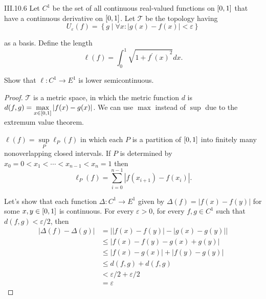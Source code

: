 \begin{problem}{III.10.6}
Let \(C^{1}\) be the set of all continuous real-valued functions on \( \left\lbrack{0,1}\right\rbrack \) that have a continuous derivative on \( \left\lbrack{0,1}\right\rbrack \). Let \( \mathscr{T} \) be the topology having
\[
	U_{\varepsilon}(f) = \left\{ g \mid \forall x: \left\vert g(x) - f(x) \right\vert < \varepsilon \right\}
\]

as a basis. Define the length
\[
	\ell(f) = \int_{0}^{1} \sqrt{1 + {f^{\prime}(x)}^{2}}dx.
\]

Show that \( \ell: C^{1} \to E^{1} \) is lower semicontinuous.
\end{problem}

\begin{proof}
	\( \mathscr{T} \) is a metric space, in which the metric function \( d \) is \( d(f, g) = \max\limits_{x\in\left\lbrack{0,1}\right\rbrack} \left\vert f(x) - g(x) \right\vert \). We can use \( \max \) instead of \( \sup \) due to the extremum value theorem.

	\( \ell(f) = \sup\limits_{P} \ell_{P}(f) \) in which each \( P \) is a partition of \( \left\lbrack{0,1}\right\rbrack \) into finitely many nonoverlapping closed intervals. If \( P \) is determined by \( x_{0} = 0 < x_{1} < \cdots < x_{n-1} < x_{n} = 1 \) then
	\[
		\ell_{P}(f) = \sum^{n-1}_{i=0} \left\vert f(x_{i+1}) - f(x_{i}) \right\vert.
	\]

	Let's show that each function \( \Delta: C^{1} \to E^{1} \) given by \( \Delta(f) = \left\vert f(x) - f(y) \right\vert \) for some \( x, y \in \left\lbrack{0,1}\right\rbrack \) is continuous. For every \( \varepsilon > 0 \), for every \( f, g \in C^{1} \) such that \( d(f, g) < \varepsilon/2 \), then
	\begingroup
	\allowdisplaybreaks%
	\begin{align*}
		\left\vert \Delta(f) - \Delta(g) \right\vert & = \left\vert \left\vert f(x) - f(y) \right\vert - \left\vert g(x) - g(y) \right\vert \right\vert \\
		                                             & \le \left\vert f(x) - f(y) - g(x) + g(y) \right\vert                                             \\
		                                             & \le \left\vert f(x) - g(x) \right\vert + \left\vert f(y) - g(y) \right\vert                      \\
		                                             & \le d(f, g) + d(f, g)                                                                            \\
		                                             & < \varepsilon/2 + \varepsilon/2                                                                  \\
		                                             & = \varepsilon
	\end{align*}
	\endgroup


\end{proof}
